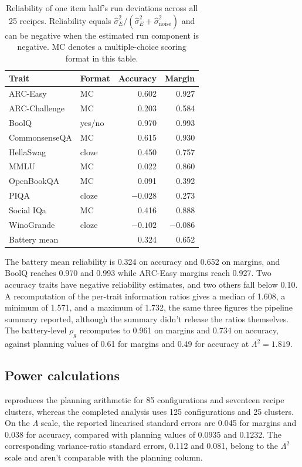 \begin{table}[!htb]
\centering
\caption{Reliability of one item half's run deviations across all 25 recipes. Reliability equals $\widehat\sigma_E^2/(\widehat\sigma_E^2+\widehat\sigma_{\mathrm{noise}}^2)$ and can be negative when the estimated run component is negative. MC denotes a multiple-choice scoring format in this table.}
\label{tab:original3}
\small\setlength{\tabcolsep}{4pt}\renewcommand{\arraystretch}{1.12}
\begin{tabular}{llrr}\toprule
Trait & Format & Accuracy & Margin\\\midrule
ARC-Easy & MC & 0.602 & 0.927\\
ARC-Challenge & MC & 0.203 & 0.584\\
BoolQ & yes/no & 0.970 & 0.993\\
CommonsenseQA & MC & 0.615 & 0.930\\
HellaSwag & cloze & 0.450 & 0.757\\
MMLU & MC & 0.022 & 0.860\\
OpenBookQA & MC & 0.091 & 0.392\\
PIQA & cloze & $-0.028$ & 0.273\\
Social IQa & MC & 0.416 & 0.888\\
WinoGrande & cloze & $-0.102$ & $-0.086$\\
Battery mean & & 0.324 & 0.652\\\bottomrule
\end{tabular}
\end{table}

The battery mean reliability is 0.324 on accuracy and 0.652 on margins, and BoolQ reaches 0.970 and 0.993 while ARC-Easy margins reach 0.927. Two accuracy traits have negative reliability estimates, and two others fall below 0.10. A recomputation of the per-trait information ratios gives a median of 1.608, a minimum of 1.571, and a maximum of 1.732, the same three figures the pipeline summary reported, although the summary didn't release the ratios themselves. The battery-level $\rho_g$ recomputes to 0.961 on margins and 0.734 on accuracy, against planning values of 0.61 for margins and 0.49 for accuracy at $\Lambda^2=1.819$.
\subsection{Power calculations}
 reproduces the planning arithmetic for 85 configurations and seventeen recipe clusters, whereas the completed analysis uses 125 configurations and 25 clusters. On the $\Lambda$ scale, the reported linearised standard errors are 0.045 for margins and 0.038 for accuracy, compared with planning values of 0.0935 and 0.1232. The corresponding variance-ratio standard errors, 0.112 and 0.081, belong to the $\Lambda^2$ scale and aren't comparable with the planning column.

